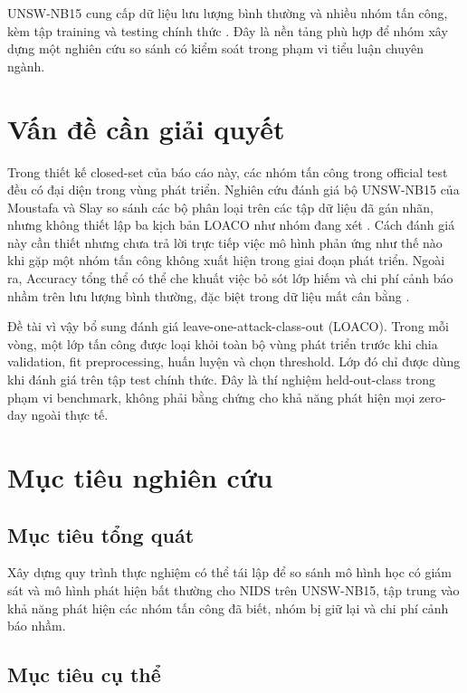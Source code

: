 \documentclass[12pt,a4paper,oneside]{report}
\newcommand{\methodname}{leave-one-attack-class-out}
\begin{document}
UNSW-NB15 cung cấp dữ liệu lưu lượng bình thường và nhiều nhóm tấn công, kèm tập training và testing chính thức \cite{moustafa2015,moustafa2016,unswsite}. Đây là nền tảng phù hợp để nhóm xây dựng một nghiên cứu so sánh có kiểm soát trong phạm vi tiểu luận chuyên ngành.

\section{Vấn đề cần giải quyết}

Trong thiết kế closed-set của báo cáo này, các nhóm tấn công trong official test đều có đại diện trong vùng phát triển. Nghiên cứu đánh giá bộ UNSW-NB15 của Moustafa và Slay so sánh các bộ phân loại trên các tập dữ liệu đã gán nhãn, nhưng không thiết lập ba kịch bản LOACO như nhóm đang xét \cite{moustafa2016}. Cách đánh giá này cần thiết nhưng chưa trả lời trực tiếp việc mô hình phản ứng như thế nào khi gặp một nhóm tấn công không xuất hiện trong giai đoạn phát triển. Ngoài ra, Accuracy tổng thể có thể che khuất việc bỏ sót lớp hiếm và chi phí cảnh báo nhầm trên lưu lượng bình thường, đặc biệt trong dữ liệu mất cân bằng \cite{saito2015}.

Đề tài vì vậy bổ sung đánh giá \methodname{} (LOACO). Trong mỗi vòng, một lớp tấn công được loại khỏi toàn bộ vùng phát triển trước khi chia validation, fit preprocessing, huấn luyện và chọn threshold. Lớp đó chỉ được dùng khi đánh giá trên tập test chính thức. Đây là thí nghiệm held-out-class trong phạm vi benchmark, không phải bằng chứng cho khả năng phát hiện mọi zero-day ngoài thực tế.

\section{Mục tiêu nghiên cứu}

\subsection{Mục tiêu tổng quát}

Xây dựng quy trình thực nghiệm có thể tái lập để so sánh mô hình học có giám sát và mô hình phát hiện bất thường cho NIDS trên UNSW-NB15, tập trung vào khả năng phát hiện các nhóm tấn công đã biết, nhóm bị giữ lại và chi phí cảnh báo nhầm.

\subsection{Mục tiêu cụ thể}
\end{document}
